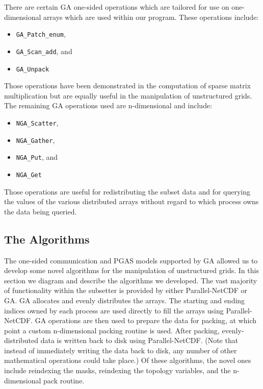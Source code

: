 There are certain GA one-sided operations which are tailored for use on
one-dimensional arrays which are used within our program.  These operations
include:

\begin{itemize}
\item \verb=GA_Patch_enum=,
\item \verb=GA_Scan_add=, and
\item \verb=GA_Unpack=
\end{itemize}

Those operations have been demonstrated in the computation of sparse matrix
multiplication\cite{GA} but are equally useful in the manipulation of
unstructured grids.  The remaining GA operations used are n-dimensional and
include:

\begin{itemize}
\item \verb=NGA_Scatter=,
\item \verb=NGA_Gather=,
\item \verb=NGA_Put=, and
\item \verb=NGA_Get=
\end{itemize}

Those operations are useful for redistributing the subset data and for
querying the values of the various distributed arrays without regard to which
process owns the data being queried.

\subsection{The Algorithms}

The one-sided communication and PGAS models supported by GA allowed us to
develop some novel algorithms for the manipulation of unstructured grids.  In
this section we diagram and describe the algorithms we developed.  The vast
majority of functionality within the subsetter is provided by either
Parallel-NetCDF or GA.  GA allocates and evenly distributes the arrays.  The
starting and ending indices owned by each process are used directly to fill
the arrays using Parallel-NetCDF.  GA operations are then used to prepare the
data for packing, at which point a custom n-dimensional packing routine is
used.  After packing, evenly-distributed data is written back to disk using
Parallel-NetCDF.  (Note that instead of immediately writing the data back to
disk, any number of other mathematical operations could take place.) Of these
algorithms, the novel ones include reindexing the masks, reindexing the
topology variables, and the n-dimensional pack routine.

